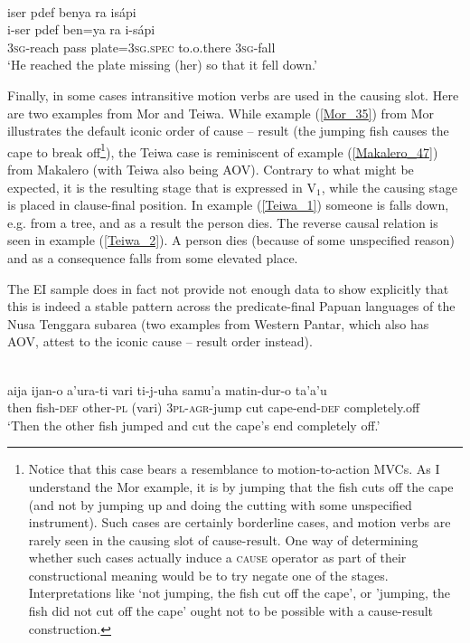 \ea \label{Biak_43}
\\
\glll iser pdef benya ra isápi \\
i-ser pdef ben=ya ra i-sápi \\
3\textsc{sg}-reach pass plate=3\textsc{sg}.\textsc{spec} to.o.there 3\textsc{sg}-fall \\
\glft `He reached the plate missing (her) so that it fell down.' \\
\z

Finally, in some cases intransitive motion verbs are used in the causing slot. Here are two examples from Mor and Teiwa. While example (\ref{Mor_35}) from Mor illustrates the default iconic order of cause -- result (the jumping fish causes the cape to break off\footnote{Notice that this case bears a resemblance to motion-to-action MVCs. As I understand the Mor example, it is by jumping that the fish cuts off the cape (and not by jumping up and doing the cutting with some unspecified instrument). Such cases are certainly borderline cases, and motion verbs are rarely seen in the causing slot of cause-result. One way of determining whether such cases actually induce a \textsc{cause} operator as part of their constructional meaning would be to try negate one of the stages. Interpretations like `not jumping, the fish cut off the cape', or 'jumping, the fish did not cut off the cape' ought not to be possible with a cause-result construction.}), the Teiwa case is reminiscent of example (\ref{Makalero_47}) from Makalero (with Teiwa also being AOV). Contrary to what might be expected, it is the resulting stage that is expressed in V$_1$, while the causing stage is placed in clause-final position. In example (\ref{Teiwa_1}) someone is falls down, e.g. from a tree, and as a result the person dies. The reverse causal relation is seen in example (\ref{Teiwa_2}). A person dies (because of some unspecified reason) and as a consequence falls from some elevated place. 

The EI sample does in fact not provide not enough data to show explicitly that this is indeed a stable pattern across the predicate-final Papuan languages of the Nusa Tenggara subarea (two examples from Western Pantar, which also has AOV, attest to the iconic cause -- result order instead).

\ea \label{Mor_35}
\\
\gll aija ijan-o a'ura-ti vari ti-j-uha samu'a matin-dur-o ta'a'u \\
then fish-\textsc{def} other-\textsc{pl} (vari) 3\textsc{pl}-\textsc{agr}-jump cut cape-end-\textsc{def} completely.off \\
\glft `Then the other fish jumped and cut the cape's end completely off.'\\ 
\z

